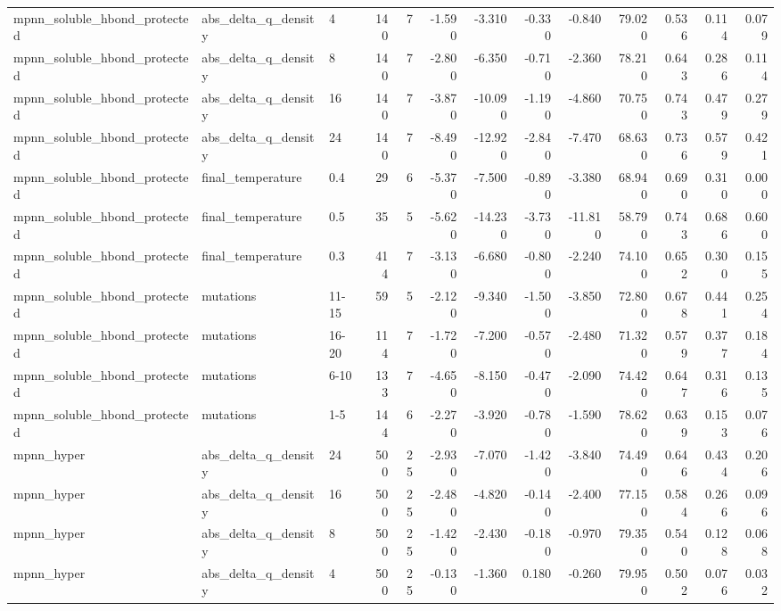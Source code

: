 \begin{table}
\begin{tabular}{lllrrrrrrrrrr}
mpnn\_soluble\_hbond\_protected & abs\_delta\_q\_density & 4 & 140 & 7 & -1.590 & -3.310 & -0.330 & -0.840 & 79.020 & 0.536 & 0.114 & 0.079 \\
mpnn\_soluble\_hbond\_protected & abs\_delta\_q\_density & 8 & 140 & 7 & -2.800 & -6.350 & -0.710 & -2.360 & 78.210 & 0.643 & 0.286 & 0.114 \\
mpnn\_soluble\_hbond\_protected & abs\_delta\_q\_density & 16 & 140 & 7 & -3.870 & -10.090 & -1.190 & -4.860 & 70.750 & 0.743 & 0.479 & 0.279 \\
mpnn\_soluble\_hbond\_protected & abs\_delta\_q\_density & 24 & 140 & 7 & -8.490 & -12.920 & -2.840 & -7.470 & 68.630 & 0.736 & 0.579 & 0.421 \\
mpnn\_soluble\_hbond\_protected & final\_temperature & 0.4 & 29 & 6 & -5.370 & -7.500 & -0.890 & -3.380 & 68.940 & 0.690 & 0.310 & 0.000 \\
mpnn\_soluble\_hbond\_protected & final\_temperature & 0.5 & 35 & 5 & -5.620 & -14.230 & -3.730 & -11.810 & 58.790 & 0.743 & 0.686 & 0.600 \\
mpnn\_soluble\_hbond\_protected & final\_temperature & 0.3 & 414 & 7 & -3.130 & -6.680 & -0.800 & -2.240 & 74.100 & 0.652 & 0.300 & 0.155 \\
mpnn\_soluble\_hbond\_protected & mutations & 11-15 & 59 & 5 & -2.120 & -9.340 & -1.500 & -3.850 & 72.800 & 0.678 & 0.441 & 0.254 \\
mpnn\_soluble\_hbond\_protected & mutations & 16-20 & 114 & 7 & -1.720 & -7.200 & -0.570 & -2.480 & 71.320 & 0.579 & 0.377 & 0.184 \\
mpnn\_soluble\_hbond\_protected & mutations & 6-10 & 133 & 7 & -4.650 & -8.150 & -0.470 & -2.090 & 74.420 & 0.647 & 0.316 & 0.135 \\
mpnn\_soluble\_hbond\_protected & mutations & 1-5 & 144 & 6 & -2.270 & -3.920 & -0.780 & -1.590 & 78.620 & 0.639 & 0.153 & 0.076 \\
mpnn\_hyper & abs\_delta\_q\_density & 24 & 500 & 25 & -2.930 & -7.070 & -1.420 & -3.840 & 74.490 & 0.646 & 0.434 & 0.206 \\
mpnn\_hyper & abs\_delta\_q\_density & 16 & 500 & 25 & -2.480 & -4.820 & -0.140 & -2.400 & 77.150 & 0.584 & 0.266 & 0.096 \\
mpnn\_hyper & abs\_delta\_q\_density & 8 & 500 & 25 & -1.420 & -2.430 & -0.180 & -0.970 & 79.350 & 0.540 & 0.128 & 0.068 \\
mpnn\_hyper & abs\_delta\_q\_density & 4 & 500 & 25 & -0.130 & -1.360 & 0.180 & -0.260 & 79.950 & 0.502 & 0.076 & 0.032 \\

\end{tabular}
\end{table}
